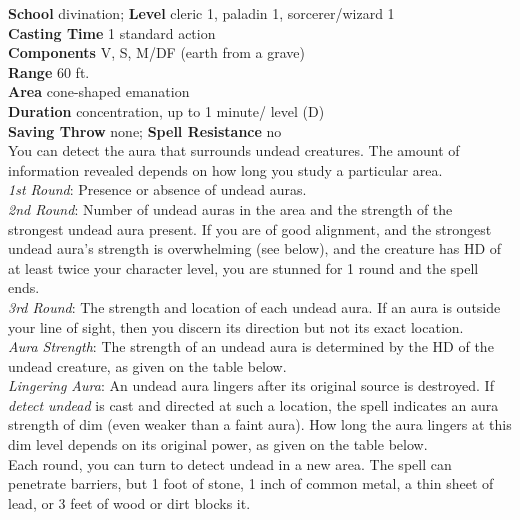 \textbf{School} divination; \textbf{Level} cleric 1, paladin 1, sorcerer/wizard 1\\
\textbf{Casting Time} 1 standard action\\
\textbf{Components} V, S, M/DF (earth from a grave)\\
\textbf{Range} 60 ft.\\
\textbf{Area} cone-shaped emanation\\
\textbf{Duration} concentration, up to 1 minute/ level (D)\\
\textbf{Saving Throw} none; \textbf{Spell Resistance} no\\
You can detect the aura that surrounds undead creatures. The amount of information revealed depends on how long you study a particular area.\\
\textit{1st Round}: Presence or absence of undead auras.\\
\textit{2nd Round}: Number of undead auras in the area and the strength of the strongest undead aura present. If you are of good alignment, and the strongest undead aura's strength is overwhelming (see below), and the creature has HD of at least twice your character level, you are stunned for 1 round and the spell ends.\\
\textit{3rd Round}: The strength and location of each undead aura. If an aura is outside your line of sight, then you discern its direction but not its exact location.\\
\textit{Aura Strength}: The strength of an undead aura is determined by the HD of the undead creature, as given on the table below.\\
\textit{Lingering Aura}: An undead aura lingers after its original source is destroyed. If \textit{detect undead }is cast and directed at such a location, the spell indicates an aura strength of dim (even weaker than a faint aura). How long the aura lingers at this dim level depends on its original power, as given on the table below.\\
Each round, you can turn to detect undead in a new area. The spell can penetrate barriers, but 1 foot of stone, 1 inch of common metal, a thin sheet of lead, or 3 feet of wood or dirt blocks it.\\
